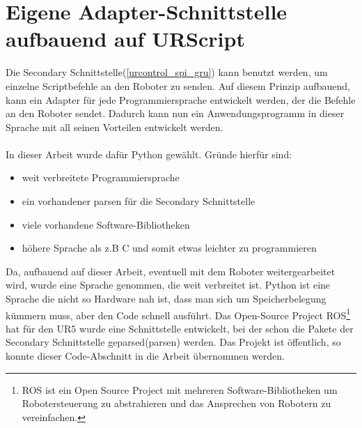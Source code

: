 \section{Eigene Adapter-Schnittstelle aufbauend auf URScript}
\label{sec:urscript_adapter}

Die Secondary Schnittstelle(\ref{urcontrol_spi_gru}) kann benutzt werden, um einzelne Scriptbefehle an den Roboter zu senden. Auf diesem Prinzip aufbauend, kann ein Adapter für jede Programmiersprache entwickelt werden, der die Befehle an den Roboter sendet. Dadurch kann nun ein Anwendungsprogramm in dieser Sprache mit all seinen Vorteilen entwickelt werden.
\\\\
In dieser Arbeit wurde dafür Python gewählt. Gründe hierfür sind:

\begin{itemize}
\item weit verbreitete Programmiersprache
\item ein vorhandener \acl{parsen} für die Secondary Schnittstelle
\item viele vorhandene Software-Bibliotheken
\item höhere Sprache als z.B C und somit etwas leichter zu programmieren
\end{itemize}

Da, aufbauend auf dieser Arbeit, eventuell mit dem Roboter weitergearbeitet wird, wurde eine Sprache genommen, die weit verbreitet ist. Python ist eine Sprache die nicht so Hardware nah ist, dass man sich um Speicherbelegung kümmern muss, aber den Code schnell ausführt.
Das Open-Source Project \ac{ROS}\footnote{ROS ist ein Open Source Project mit mehreren Software-Bibliotheken um Robotersteuerung zu abstrahieren und das Ansprechen von Robotern zu vereinfachen.} hat für den UR5 wurde eine Schnittstelle entwickelt, bei der schon die Pakete der Secondary Schnittstelle geparsed(\acl{parsen}) werden. Das Projekt ist öffentlich, so konnte dieser Code-Abschnitt in die Arbeit übernommen werden.